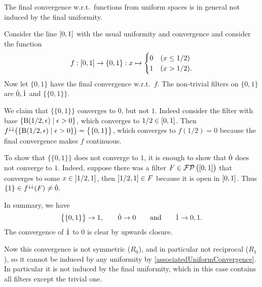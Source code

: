 \begin{example}
The final convergence w.r.t.\ functions from uniform spaces is in general not induced by the final uniformity.

Consider the line $\interval{0,1}$ with the usual uniformity and convergence and consider the function
\[ f: \interval{0,1}\to \{0,1\}: x\mapsto \begin{cases}
0 & (x\leq 1/2) \\
1 & (x > 1/2).
\end{cases} \]
Now let $\{0,1\}$ have the final convergence w.r.t.\ $f$. The non-trivial filters on $\{0,1\}$ are $\dot{0}, \dot{1}$ and $\big\{\{0,1\}\big\}$.

We claim that $\big\{\{0,1\}\big\}$ converges to $0$, but not $1$. Indeed consider the filter with base $\setbuilder{\ball(1/2, \epsilon)}{\epsilon>0}$, which converges to $1/2\in \interval{0,1}$. Then $f^{\imf\imf}\big(\setbuilder{\ball(1/2, \epsilon)}{\epsilon>0}\big) = \big\{\{0,1\}\big\}$, which converges to $f(1/2) = 0$ because the final convergence makes $f$ continuous.

To show that $\big\{\{0,1\}\big\}$ does not converge to $1$, it is enough to show that $\dot{0}$ does not converge to $1$. Indeed, suppose there was a filter $F\in \powerfilters\big(\interval{0,1}\big)$ that converges to some $x\in \interval[oc]{1/2,1}$, then $\interval[oc]{1/2,1}\in F$ because it is open in $\interval{0,1}$. Thus $\{1\}\in f^{\downarrow\downarrow}(F) \neq \dot{0}$.

In summary, we have
\[ \big\{\{0,1\}\big\} \to 1, \qquad \dot{0} \to 0 \qquad\text{and}\qquad \dot{1}\to 0,1. \]
The convergence of $\dot{1}$ to $0$ is clear by upwards closure.

Now this convergence is not symmetric ($R_0$), and in particular not reciprocal ($R_1$), so it cannot be induced by any uniformity by \ref{associatedUniformConvergence}. In particular it is not induced by the final uniformity, which in this case contains all filters except the trivial one.
\end{example}

